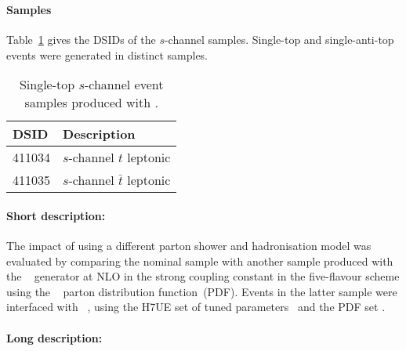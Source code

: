 \subsubsection[Powheg+Herwig7]{\POWHER[7]}
\label{subsubsec:schan_PH7}

\paragraph{Samples}

Table~\ref{tab:schan_PH7} gives the DSIDs of the $s$-channel \POWHER[7] samples.
Single-top and single-anti-top events were generated in distinct samples.

\begin{table}[htbp]
  \caption{Single-top $s$-channel event samples produced with \POWHER[7].}%
  \label{tab:schan_PH7}
  \centering
  \begin{tabular}{l l}
    \toprule
    DSID & Description \\
    \midrule
    411034 & $s$-channel $t$ leptonic \\
    411035 & $s$-channel $\bar{t}$ leptonic \\
    \bottomrule
  \end{tabular}
\end{table}

\paragraph{Short description:}

The impact of using a different parton shower and hadronisation model was evaluated by comparing the nominal sample
with another sample produced with the \POWHEGBOX[v2]~\cite{Alioli:2009je,Nason:2004rx,Frixione:2007vw,Alioli:2010xd}
generator at NLO in the strong coupling constant \alphas in the five-flavour scheme using the 
\NNPDF[3.0nlo]~\cite{Ball:2014uwa} parton distribution function~(PDF).
Events in the latter sample were interfaced with \HERWIG[7.04]~\cite{Bahr:2008pv,Bellm:2015jjp}, using the H7UE set of
tuned parameters~\cite{Bellm:2015jjp} and the \MMHT[lo] PDF set \cite{Harland-Lang:2014zoa}.


\paragraph{Long description:}

